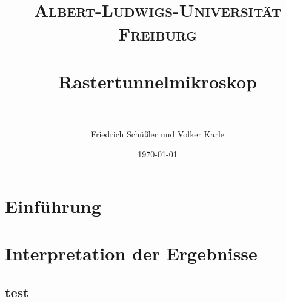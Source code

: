 \documentclass[paper=a4, fontsize=12pt, xcolor=dvipsnames]{scrartcl} %
\title{ 
\normalfont \normalsize 
\textsc{Albert-Ludwigs-Universität Freiburg} \\ [25pt] %
\horrule{0.5pt} \\[0.4cm] %
\huge Rastertunnelmikroskop \\ %
\horrule{2pt} \\[0.5cm] %
}
\author{Friedrich Schüßler und Volker Karle} %
\date{\normalsize\today} %
\numberwithin{equation}{section} %
\numberwithin{figure}{section} %
\numberwithin{table}{section} %
\begin{document}
\maketitle

\tableofcontents
\thispagestyle{empty}
\newpage
\setcounter{page}{1}



\section{Einführung}






\section{Interpretation der Ergebnisse}
\subsection{test}



\end{document}
